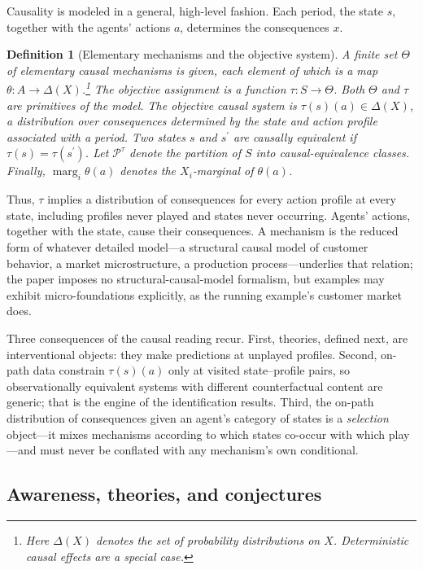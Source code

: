 \documentclass[11pt]{article}
\newtheorem{definition}[assumption]{Definition}
\theoremstyle{definition}
\newcommand{\marg}[1]{\operatorname{marg}_{#1}}
\begin{document}
Causality is modeled in a general, high-level fashion.
Each period, the state \(s\), together with the agents' actions \(a\), determines the consequences \(x\).


\begin{definition}[Elementary mechanisms and the objective system]
\label{def:mechanisms}
A finite set $\Theta$ of \emph{elementary causal mechanisms} is given, each element of which is a map $\theta:A\to\Delta(X)$.\footnote
{
	Here \(\Delta(X)\) denotes the set of probability distributions on \(X\).
	Deterministic causal effects are a special case.
}
The \emph{objective assignment} is a function $\tau:S\to\Theta$.
Both \(\Theta\) and \(\tau\) are primitives of the model.
The \emph{objective causal system} is $\tau(s)(a)\in\Delta(X)$, a distribution over consequences determined by the state and action profile associated with a period.
Two states \(s\) and \(s^\prime\) are \emph{causally equivalent} if $\tau(s)=\tau(s^\prime)$. 
Let $\mathcal P^{\tau}$ denote the partition of $S$ into causal-equivalence classes. 
Finally, $\marg{i}\theta(a)$ denotes the $X_i$-marginal of $\theta(a)$.
\end{definition}

Thus, $\tau$ implies a distribution of consequences for every action profile at every state, including profiles never played and states never occurring.
Agents' actions, together with the state, cause their consequences.
A mechanism is the reduced form of whatever detailed model---a structural causal model of customer behavior, a market microstructure, a production process---underlies that relation; the paper imposes no structural-causal-model formalism, but examples may exhibit micro-foundations explicitly, as the running example's customer market does.

Three consequences of the causal reading recur.
First, theories, defined next, are interventional objects: they make predictions at unplayed profiles.
Second, on-path data constrain $\tau(s)(a)$ only at visited state--profile pairs, so observationally equivalent systems with different counterfactual content are generic; that is the engine of the identification results.
Third, the on-path distribution of consequences given an agent's category of states is a \emph{selection} object---it mixes mechanisms according to which states co-occur with which play---and must never be conflated with any mechanism's own conditional.

\subsection{Awareness, theories, and conjectures}
\label{sec:awareness-sub}
\end{document}
